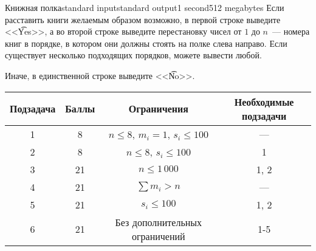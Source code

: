 \begin{problem}{Книжная полка}{standard input}{standard output}{1 second}{512 megabytes}
\OutputFile
Если расставить книги желаемым образом возможно, в первой строке выведите <<\t{Yes}>>, а во второй строке выведите перестановку чисел от $1$ до $n$~--- номера книг в порядке, в котором они должны стоять на полке слева направо. Если существует несколько подходящих порядков, можете вывести любой.

Иначе, в единственной строке выведите <<\t{No}>>.


\newpage
\Scoring
\begin{tabular}{|c|c|c|c|}
\hline
Подзадача & Баллы & Ограничения & Необходимые подзадачи \\
\hline
1 & 8 & $n \le 8$, $m_i = 1$, $s_i \le 100$ & {---} \\
\hline
2 & 8 & $n \le 8$, $s_i \le 100$ & 1 \\
\hline
3 & 21 & $n \le 1\,000$ & 1, 2 \\
\hline
4 & 21 & $\sum m_i > n$ & {---} \\
\hline
5 & 21 & $s_i \le 100$ & 1, 2 \\
\hline
6 & 21 & Без дополнительных ограничений & 1-5 \\
\hline
\end{tabular}

\Examples

\begin{example}
%
%
%
%
%
\end{example}

\end{problem}

